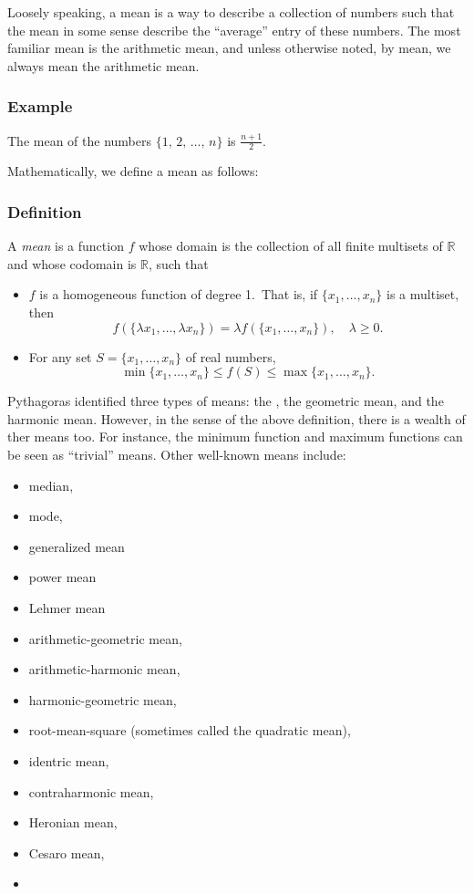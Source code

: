 \documentclass[12pt]{article}
\begin{document}
Loosely speaking, a mean is a way to describe a collection of numbers such
that the mean in some sense describe the ``average'' entry of these numbers. 
The most familiar mean is the arithmetic mean, and unless otherwise noted, by mean,
we always mean the arithmetic mean. 

\subsubsection*{Example} 
The mean of the numbers $\{1,\,2,\,\ldots,\,n\}$ is $\frac{n+1}{2}$. 

Mathematically, we define a mean as follows:

\subsubsection*{Definition}
A \emph{mean} is a function $f$ whose domain is the collection of
all finite multisets of $\mathbb{R}$ and whose codomain is $\mathbb{R}$, 
such that 
\begin{itemize}
\item $f$ is a homogeneous function of degree 1.\, That is, if $\{x_1, \ldots, x_n\}$ is a multiset, then 
$$ 
  f(\{ \lambda x_1, \ldots, \lambda x_n\}) = \lambda f(\{x_1, \ldots, x_n\}),\quad \lambda\ge 0.
$$
\item For any set $S = \{x_1,\ldots,x_n\}$ of real numbers,
$$ \min\{x_1,\ldots,x_n\} \leq f(S) \leq \max\{x_1,\ldots,x_n\}.$$
\end{itemize}

Pythagoras identified three types of means: the , the geometric
mean, and the harmonic mean. However, in the sense of the above definition, 
there is a wealth of ther means too. For instance, the minimum function and maximum
functions can be seen as ``trivial'' means. Other well-known means include: 

\begin{itemize}
\item median, 
\item mode, 
\item generalized mean
\item power mean
\item Lehmer mean
\item arithmetic-geometric mean, 
\item arithmetic-harmonic mean, 
\item harmonic-geometric mean, 
\item root-mean-square (sometimes called the quadratic mean), 
\item identric mean, 
\item contraharmonic mean,
\item Heronian mean, 
\item Cesaro mean,
\item {}
\end{itemize}
\end{document}
